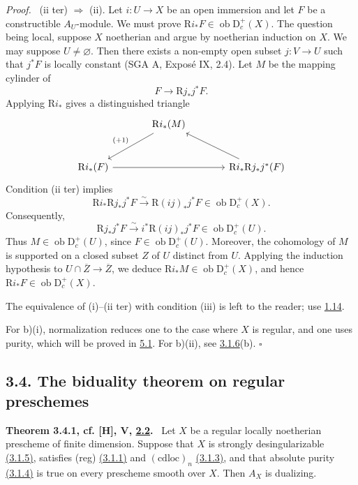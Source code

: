 \documentclass[11pt]{article}
\providecommand{\qedtext}{\hfill$\square$}
\newenvironment{statement}[1]{\par\medskip\noindent\textbf{#1.}\ }{\par\medskip}
\newenvironment{prooftext}[1][Proof]{\par\noindent\emph{#1.}\ }{\par\medskip}
\newcommand{\R}{\mathrm{R}}
\newcommand{\D}{\mathrm{D}}
\newcommand{\ob}{\operatorname{ob}}
\newcommand{\ol}[1]{\overline{#1}}
\providecommand{\ob}{\operatorname{ob}}
\providecommand{\R}{\mathrm R}
\providecommand{\qedtext}{\hfill$\square$}
\begin{document}
\begin{prooftext}
(ii ter) $\Rightarrow$ (ii). Let $i:U\to X$ be an open immersion and let $F$ be a constructible $A_U$-module. We must prove $\R i_*F\in\ob\D_c^+(X)$. The question being local, suppose $X$ noetherian and argue by noetherian induction on $X$. We may suppose $U\ne\varnothing$. Then there exists a non-empty open subset $j:V\to U$ such that $j^*F$ is locally constant (SGA A, Exposé IX, 2.4). Let $M$ be the mapping cylinder of
\[
   F\longrightarrow \R j_*j^*F.
\]
Applying $\R i_*$ gives a distinguished triangle
\[
\begin{tikzcd}[column sep=large,row sep=large]
& \R i_*(M) \arrow[dl,"{(+1)}"'] & \\
\R i_*(F) \arrow[rr] & & \R i_*\R j_*j^*(F) \arrow[ul]
\end{tikzcd}
\]
Condition (ii ter) implies
\[
   \R i_*\R j_*j^*F\xrightarrow{\sim}\R(ij)_*j^*F\in\ob\D_c^+(X).
\]
Consequently,
\[
   \R j_*j^*F\xrightarrow{\sim}i^*\R(ij)_*j^*F\in\ob\D_c^+(U).
\]
Thus $M\in\ob\D_c^+(U)$, since $F\in\ob\D_c^+(U)$. Moreover, the cohomology of $M$ is supported on a closed subset $Z$ of $U$ distinct from $U$. Applying the induction hypothesis to $U\cap\ol Z\to\ol Z$, we deduce $\R i_*M\in\ob\D_c^+(X)$, and hence $\R i_*F\in\ob\D_c^+(X)$.

The equivalence of (i)--(ii ter) with condition (iii) is left to the reader; use \hyperref[sga5:I:lemma:1.14]{1.14}.

For b)(i), normalization reduces one to the case where $X$ is regular, and one uses purity, which will be proved in \hyperref[sga5:I:theorem:5.1]{5.1}. For b)(ii), see \hyperref[sga5:I:statement:3.1.6]{3.1.6}(b). \qedtext
\end{prooftext}

\subsection*{3.4. The biduality theorem on regular preschemes}\label{sga5:I:subsection:3.4}

\label{sga5:I:theorem:3.4.1}\begin{statement}{Theorem 3.4.1, cf. [H], V, \hyperref[sga5:I:lemma:2.2]{2.2}}
Let $X$ be a regular locally noetherian prescheme of finite dimension. Suppose that $X$ is strongly desingularizable \hyperref[sga5:I:statement:3.1.5]{(3.1.5)}, satisfies (reg) \hyperref[sga5:I:statement:3.1.1]{(3.1.1)} and $(\mathrm{cdloc})_n$ \hyperref[sga5:I:statement:3.1.3]{(3.1.3)}, and that absolute purity \hyperref[sga5:I:statement:3.1.4]{(3.1.4)} is true on every prescheme smooth over $X$. Then $A_X$ is dualizing.
\end{statement}
\end{document}

